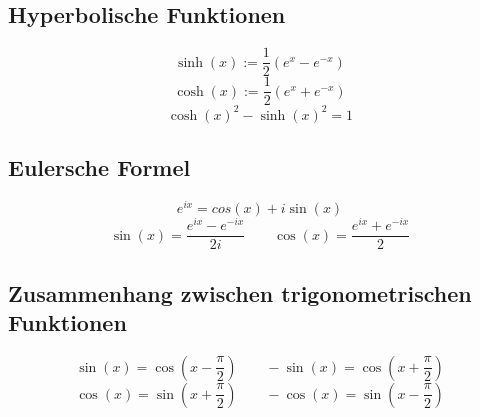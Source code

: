 \documentclass[10pt,a4paper]{article}
\begin{document}
\subsection*{Hyperbolische Funktionen}
\[\sinh(x) := \frac{1}{2} \left(e^x - e^{-x} \right)\]
\[\cosh(x) := \frac{1}{2} \left(e^x + e^{-x} \right)\]
\[\cosh(x)^2 - \sinh(x)^2 = 1\]

\subsection*{Eulersche Formel}
\[e^{ix}=cos(x)+i\sin(x)\]
\[\sin(x)=\frac{e^{ix}-e^{-ix}}{2i} \qquad \cos(x)=\frac{e^{ix}+e^{-ix}}{2}\]

\subsection*{Zusammenhang zwischen trigonometrischen Funktionen}
\[\sin(x)=\cos\left(x-\frac{\pi}{2}\right) \qquad -\sin(x)=\cos\left(x+\frac{\pi}{2}\right)\]
\[\cos(x)=\sin\left(x+\frac{\pi}{2}\right) \qquad -\cos(x)=\sin\left(x-\frac{\pi}{2}\right)\]
\end{document}
